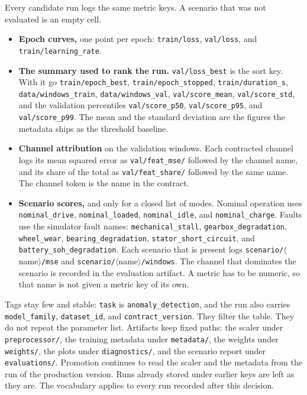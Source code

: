 Every candidate run logs the same metric keys. A scenario that was not evaluated is an empty cell.
\begin{itemize}
    \item \textbf{Epoch curves,} one point per epoch: \texttt{train/loss}, \texttt{val/loss}, and \texttt{train/learning\_rate}.
    \item \textbf{The summary used to rank the run.} \texttt{val/loss\_best} is the sort key. With it go \texttt{train/epoch\_best}, \texttt{train/epoch\_stopped}, \texttt{train/duration\_s}, \texttt{data/windows\_train}, \texttt{data/windows\_val}, \texttt{val/score\_mean}, \texttt{val/score\_std}, and the validation percentiles \texttt{val/score\_p50}, \texttt{val/score\_p95}, and \texttt{val/score\_p99}. The mean and the standard deviation are the figures the metadata ships as the threshold baseline.
    \item \textbf{Channel attribution} on the validation windows. Each contracted channel logs its mean squared error as \texttt{val/feat\_mse/} followed by the channel name, and its share of the total as \texttt{val/feat\_share/} followed by the same name. The channel token is the name in the contract.
    \item \textbf{Scenario scores,} and only for a closed list of modes. Nominal operation uses \texttt{nominal\_drive}, \texttt{nominal\_loaded}, \texttt{nominal\_idle}, and \texttt{nominal\_charge}. Faults use the simulator fault names: \texttt{mechanical\_stall}, \texttt{gearbox\_degradation}, \texttt{wheel\_wear}, \texttt{bearing\_degradation}, \texttt{stator\_short\_circuit}, and \texttt{battery\_soh\_degradation}. Each scenario that is present logs \texttt{scenario/}$\langle$name$\rangle$\texttt{/mse} and \texttt{scenario/}$\langle$name$\rangle$\texttt{/windows}. The channel that dominates the scenario is recorded in the evaluation artifact. A metric has to be numeric, so that name is not given a metric key of its own.
\end{itemize}

Tags stay few and stable: \texttt{task} is \texttt{anomaly\_detection}, and the run also carries \texttt{model\_family}, \texttt{dataset\_id}, and \texttt{contract\_version}. They filter the table. They do not repeat the parameter list. Artifacts keep fixed paths: the scaler under \texttt{preprocessor/}, the training metadata under \texttt{metadata/}, the weights under \texttt{weights/}, the plots under \texttt{diagnostics/}, and the scenario report under \texttt{evaluations/}. Promotion continues to read the scaler and the metadata from the run of the production version. Runs already stored under earlier keys are left as they are. The vocabulary applies to every run recorded after this decision.

